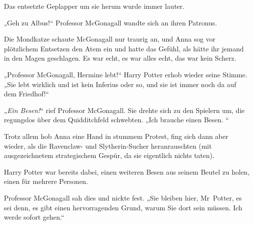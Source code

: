 Das entsetzte Geplapper um sie herum wurde immer lauter.

„Geh zu Albus!“
Professor McGonagall wandte sich an ihren Patronus.

Die Mondkatze schaute McGonagall nur traurig an, und Anna sog vor plötzlichem Entsetzen den Atem ein und hatte das Gefühl, als hätte ihr jemand in den Magen geschlagen. Es war echt, es war alles echt, das war kein Scherz.

„Professor McGonagall, Hermine lebt!“
Harry Potter erhob wieder seine Stimme.
„Sie lebt wirklich und ist kein Inferius oder so, und sie ist immer noch da auf dem Friedhof!“

„\emph{Ein Besen!}“ rief Professor McGonagall.
Sie drehte sich zu den Spielern um, die regungslos über dem Quidditchfeld schwebten.
„Ich brauche einen Besen. “

Trotz allem hob Anna eine Hand in stummem Protest, fing sich dann aber wieder, als die Ravenclaw- und Slytherin-Sucher heranrauschten (mit ausgezeichnetem strategischem Gespür, da sie eigentlich nichts taten).

Harry Potter war bereits dabei, einen weiteren Besen aus seinem Beutel zu holen, einen für mehrere Personen.

Professor McGonagall sah dies und nickte fest.
„Sie bleiben hier, Mr~Potter, es sei denn, es gibt einen hervorragenden Grund, warum Sie dort sein müssen. Ich werde sofort gehen.“

